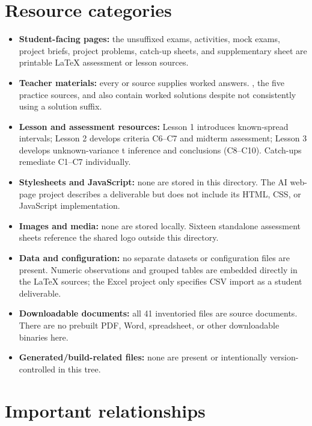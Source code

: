 \section{Resource categories}

\begin{itemize}
\item \textbf{Student-facing pages:} the unsuffixed exams, activities, mock exams, project briefs, project problems, catch-up sheets, and supplementary sheet are printable LaTeX assessment or lesson sources.
\item \textbf{Teacher materials:} every  or  source supplies worked answers. , the five practice sources, and  also contain worked solutions despite not consistently using a solution suffix.
\item \textbf{Lesson and assessment resources:} Lesson 1 introduces known-spread intervals; Lesson 2 develops criteria C6–C7 and midterm assessment; Lesson 3 develops unknown-variance t inference and conclusions (C8–C10). Catch-ups remediate C1–C7 individually.
\item \textbf{Stylesheets and JavaScript:} none are stored in this directory. The AI web-page project describes a deliverable but does not include its HTML, CSS, or JavaScript implementation.
\item \textbf{Images and media:} none are stored locally. Sixteen standalone assessment sheets reference the shared logo outside this directory.
\item \textbf{Data and configuration:} no separate datasets or configuration files are present. Numeric observations and grouped tables are embedded directly in the LaTeX sources; the Excel project only specifies CSV import as a student deliverable.
\item \textbf{Downloadable documents:} all 41 inventoried files are  source documents. There are no prebuilt PDF, Word, spreadsheet, or other downloadable binaries here.
\item \textbf{Generated/build-related files:} none are present or intentionally version-controlled in this tree.
\end{itemize}

\section{Important relationships}

